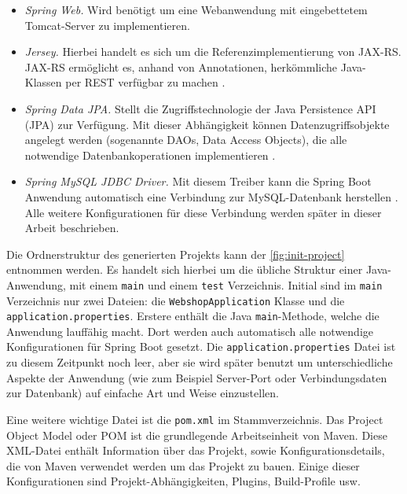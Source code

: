 \begin{itemize}
	\item \textit{Spring Web.} Wird benötigt um eine Webanwendung mit eingebettetem Tomcat-Server zu implementieren.
	\item \textit{Jersey.} Hierbei handelt es sich um die Referenzimplementierung von JAX-RS. JAX-RS ermöglicht es, anhand von Annotationen, herkömmliche Java-Klassen per REST verfügbar zu machen \cite{Oracle2015}.
	\item \textit{Spring Data JPA.} Stellt die Zugriffstechnologie der Java Persistence API (\acs{JPA}) zur Verfügung. Mit dieser Abhängigkeit können Datenzugriffsobjekte angelegt werden (sogenannte \acs{DAO}s, Data Access Objects), die alle notwendige Datenbankoperationen implementieren \cite{Webb2017}.
	\item \textit{Spring MySQL JDBC Driver.} Mit diesem Treiber kann die Spring Boot Anwendung automatisch eine Verbindung zur MySQL-Datenbank herstellen \cite{Webb2017}. Alle weitere Konfigurationen für diese Verbindung werden später in dieser Arbeit beschrieben.
\end{itemize}

Die Ordnerstruktur des generierten Projekts kann der \cref{fig:init-project} entnommen werden.
Es handelt sich hierbei um die übliche Struktur einer Java-Anwendung, mit einem \texttt{main} und einem \texttt{test} Verzeichnis.
Initial sind im \texttt{main} Verzeichnis nur zwei Dateien: die \texttt{WebshopApplication} Klasse und die \texttt{application.properties}.
Erstere enthält die Java \texttt{main}-Methode, welche die Anwendung lauffähig macht.
Dort werden auch automatisch alle notwendige Konfigurationen für Spring Boot gesetzt.
Die \texttt{application.properties} Datei ist zu diesem Zeitpunkt noch leer, aber sie wird später benutzt um unterschiedliche Aspekte der Anwendung (wie zum Beispiel Server-Port oder Verbindungsdaten zur Datenbank) auf einfache Art und Weise einzustellen.

Eine weitere wichtige Datei ist die \texttt{pom.xml} im Stammverzeichnis. Das Project Object Model oder \acs{POM} ist die grundlegende Arbeitseinheit von Maven.
Diese XML-Datei enthält Information über das Projekt, sowie Konfigurationsdetails, die von Maven verwendet werden um das Projekt zu bauen.
Einige dieser Konfigurationen sind Projekt-Abhängigkeiten, Plugins, Build-Profile usw. \cite{Foundation2017}

